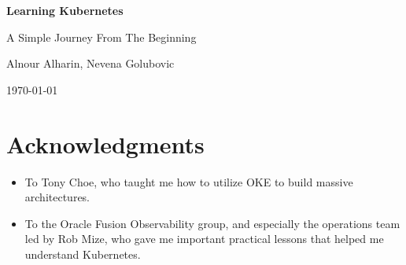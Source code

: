 \frontmatter

\begin{titlepage}
\centering
\vspace*{3cm}

{\Huge\bfseries\color{darkblue} Learning Kubernetes \par}

\vspace{0.5cm}
{\Large\color{sectioncolor} A Simple Journey From The Beginning \par}

\vspace{2cm}
{\large Alnour Alharin, Nevena Golubovic \par}

\vfill
{\large \today \par}
\end{titlepage}

\chapter*{Acknowledgments}
\begin{itemize}
\item To Tony Choe, who taught me how to utilize OKE to build massive architectures.
\item To the Oracle Fusion Observability group, and especially the operations team led by Rob Mize, who gave me important practical lessons that helped me understand Kubernetes.
\end{itemize}

\clearpage

\tableofcontents
\clearpage
